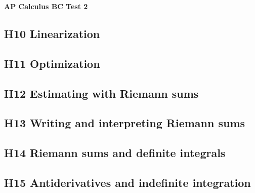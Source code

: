 \documentclass[letterpaper, 12pt]{article}
\begin{document}
\begin{center}
\textbf{{\Large AP Calculus BC Test 2}}
\end{center}

\subsection*{H10 Linearization}

\subsection*{H11 Optimization}

\subsection*{H12 Estimating with Riemann sums}

\subsection*{H13 Writing and interpreting Riemann sums}

\subsection*{H14 Riemann sums and definite integrals}

\subsection*{H15 Antiderivatives and indefinite integration}
\end{document}
